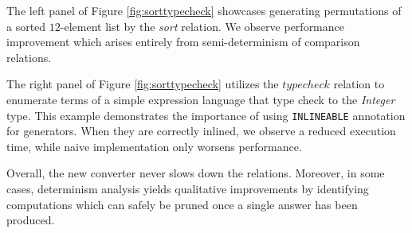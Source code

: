 The left panel of Figure \ref{fig:sorttypecheck} showcases generating permutations of a sorted $12$-element list by the \emph{sort} relation. 
We observe performance improvement which arises entirely from semi-determinism of comparison relations.

The right panel of Figure \ref{fig:sorttypecheck} utilizes the $typecheck$ relation to enumerate terms of a simple expression language that type check to the \emph{Integer} type. 
This example demonstrates the importance of using \lstinline{INLINEABLE} annotation for generators. 
When they are correctly inlined, we observe a reduced execution time, while naive implementation only worsens performance. 

Overall, the new converter never slows down the relations. 
Moreover, in some cases, determinism analysis yields qualitative improvements by identifying computations which can safely be pruned once a single answer has been produced. 
